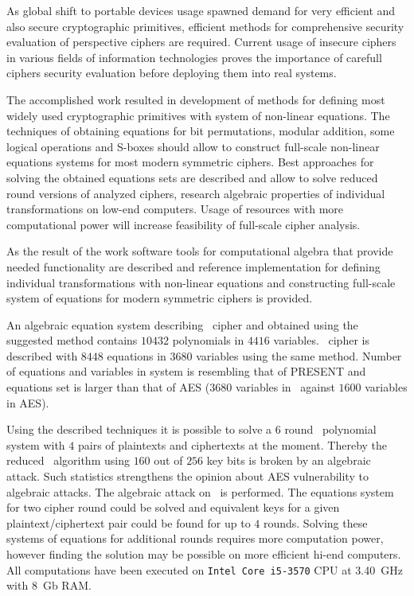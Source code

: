 
\label{sec:conclusions}

As global shift to portable devices usage spawned demand for very efficient and
also secure cryptographic primitives, efficient methods for comprehensive
security evaluation of perspective ciphers are required. Current usage of
insecure ciphers in various fields of information technologies proves the
importance of carefull ciphers security evaluation before deploying them into
real systems.

The accomplished work resulted in development of methods for defining most
widely used cryptographic primitives with system of non-linear equations. The
techniques of obtaining equations for bit permutations, modular addition, some
logical operations and S-boxes should allow to construct full-scale non-linear
equations systems for most modern symmetric ciphers. Best approaches for solving
the obtained equations sets are described and allow to solve reduced round
versions of analyzed ciphers, research algebraic properties of individual
transformations on low-end computers. Usage of resources with more
computational power will increase feasibility of full-scale cipher analysis.

As the result of the work software tools for computational algebra that provide
needed functionality are described and reference implementation for defining
individual transformations with non-linear equations and constructing full-scale
system of equations for modern symmetric ciphers is provided.

An algebraic equation system describing \gost\ cipher and obtained using the
suggested method contains $10432$ polynomials in $4416$ variables. \misty\
cipher is described with $8448$ equations in $3680$ variables using the same
method. Number of equations and variables in \gost system is resembling
that of PRESENT and \misty equations set is larger than that of AES ($3680$
variables in \misty\ against $1600$ variables in AES).

Using the described techniques it is possible to solve a $6$ round
\gost\ polynomial system with $4$ pairs of plaintexts and ciphertexts at the
moment. Thereby the reduced \gost\ algorithm using $160$ out of $256$ key bits is
broken by an algebraic attack. Such statistics strengthens the opinion about
AES vulnerability to algebraic attacks. The
algebraic attack on \misty\ is performed. The equations system for two cipher
round could be solved and equivalent keys for a given
\mbox{plaintext/ciphertext} pair could be found for up to $4$ rounds.
Solving these systems of equations for additional rounds requires more
computation power, however finding the solution may be possible on more
efficient hi-end computers. All computations have been executed on
 \verb+Intel Core i5-3570+ CPU at 3.40~GHz with 8~Gb RAM.

